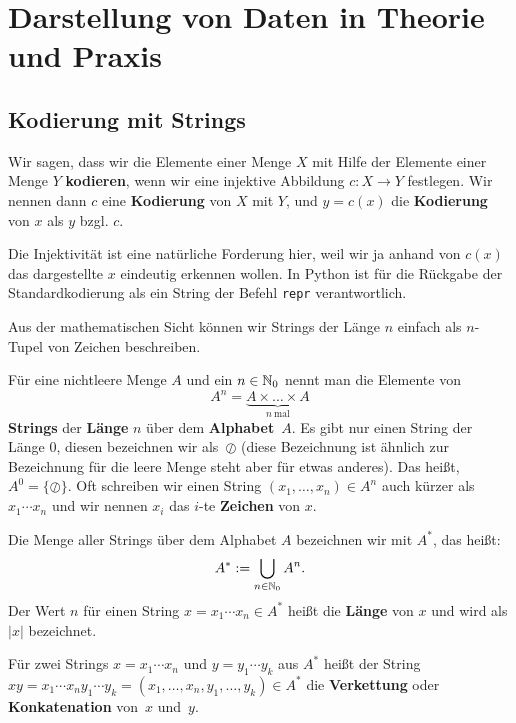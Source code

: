 \section{Darstellung von Daten in Theorie und Praxis} 

\subsection{Kodierung mit Strings} 

\begin{defn}
Wir sagen, dass wir die Elemente einer Menge $X$ mit Hilfe der Elemente einer Menge $Y$ \textbf{kodieren}, wenn wir eine  injektive Abbildung $c : X \to Y$ festlegen. Wir nennen dann $c$ eine \textbf{Kodierung} von $X$ mit $Y$, und $y=c(x)$ die \textbf{Kodierung} von $x$ als $y$ bzgl. $c$.  

Die Injektivität ist eine natürliche Forderung hier, weil wir ja anhand von $c(x)$ das dargestellte $x$ eindeutig erkennen wollen. In Python ist für die Rückgabe der Standardkodierung als ein String der Befehl \lstinline|repr| verantwortlich. 
\end{defn}

\begin{defn} 
	Aus der mathematischen Sicht können wir Strings der Länge $n$ einfach als $n$-Tupel von Zeichen beschreiben. 
	
	Für eine nichtleere Menge $A$ und ein $n \in \mathbb{N}_0$ nennt man die Elemente von 
	\[
		A^n = \underbrace{A\times\ldots\times A}_{n \ \text{mal}}
	\]
	\textbf{Strings} der \textbf{Länge} $n$ über dem \textbf{Alphabet}~$A$.
	Es gibt nur einen String der Länge $0$, diesen bezeichnen wir als~$\oslash$ (diese Bezeichnung ist ähnlich zur Bezeichnung für die leere Menge steht aber für etwas anderes). 
	Das heißt, $A^0 = \{\oslash\}$. 
	Oft schreiben wir einen String $(x_1,\ldots,x_n) \in A^n$ auch kürzer als $x_1 \cdots x_n$ und wir nennen $x_i$ das $i$-te \textbf{Zeichen} von $x$. 
	
	Die Menge aller Strings über dem Alphabet $A$ bezeichnen wir mit $A^\ast$, das heißt: 
	\[
		A^\ast := \bigcup_{n \in \mathbb{N}_0} A^n.
	\]
	Der Wert $n$ für einen String $x = x_1 \cdots x_n \in A^\ast$ heißt die \textbf{Länge} von $x$ und wird als $|x|$ bezeichnet. 
\end{defn}

\begin{defn} 
		Für zwei Strings $x=x_1 \cdots x_n$ und $y=y_1 \cdots y_k$ aus $A^\ast$ heißt der String $xy = x_1 \cdots x_n y_1 \cdots y_k = (x_1,\ldots,x_n,y_1,\ldots,y_k) \in A^\ast$ die \textbf{Verkettung} oder \textbf{Konkatenation} von~$x$ und~$y$. 
\end{defn} 

